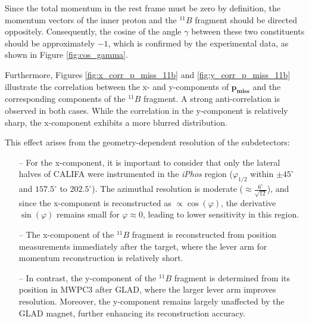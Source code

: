 Since the total momentum in the rest frame must be zero by definition, the momentum vectors of the inner proton and the $^{11}B$ fragment should be directed oppositely. Consequently, the cosine of the angle $\gamma$ between these two constituents should be approximately $-1$, which is confirmed by the experimental data, as shown in Figure \ref{fig:cos_gamma}.\newline

Furthermore, Figures \ref{fig:x_corr_p_miss_11b} and \ref{fig:y_corr_p_miss_11b} illustrate the correlation between the x- and y-components of $\mathbf{p_{miss}}$ and the corresponding components of the $^{11}B$ fragment. A strong anti-correlation is observed in both cases. While the correlation in the y-component is relatively sharp, the x-component exhibits a more blurred distribution.\newline

This effect arises from the geometry-dependent resolution of the subdetectors:
\begin{itemize}
\item[--]For the x-component, it is important to consider that only the lateral halves of CALIFA were instrumented in the \textit{iPhos} region ($\varphi_{1/2}$ within $\pm 45^{\circ}$ and $157.5^{\circ}$ to $202.5^{\circ}$). The azimuthal resolution is moderate ($\approx \frac{6^{\circ}}{\sqrt{12}}$), and since the x-component is reconstructed as $\propto \cos(\varphi)$, the derivative $\sin(\varphi)$ remains small for $\varphi \approx 0$, leading to lower sensitivity in this region.
\item[--] The x-component of the $^{11}B$ fragment is reconstructed from position measurements immediately after the target, where the lever arm for momentum reconstruction is relatively short.
\item[--]In contrast, the y-component of the $^{11}B$ fragment is determined from its position in MWPC3 after GLAD, where the larger lever arm improves resolution. Moreover, the y-component remains largely unaffected by the GLAD magnet, further enhancing its reconstruction accuracy.
\end{itemize}

